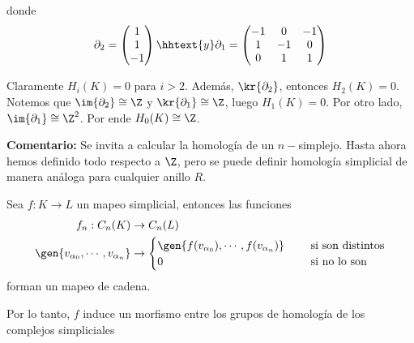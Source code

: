 \documentclass{article}
\begin{document}
\begin{enumerate}
    \vspace{2mm}
    \centerline{
    }
    \vspace{2mm}
    donde
    \begin{equation*}
        \partial_{2}=\begin{pmatrix}
            1 \\ 1 \\ -1
        \end{pmatrix}
        \hhtext{y}
        \partial_{1}=\begin{pmatrix}
            -1 & 0 & -1 \\ 1 & -1 & 0 \\ 0 & 1 & 1
        \end{pmatrix}
    \end{equation*}

    Claramente $H_{i}(K)=0$ para $i>2$. Además, $\kr{\partial_{2}}$, entonces $H_{2}(K)=0$. 
    Notemos que $\im{\partial_{2}}\cong\Z$ y $\kr{\partial_{1}}\cong\Z$, luego $H_{1}(K)=0$. Por
    otro lado, $\im{\partial_{1}}\cong\Z^{2}$. Por ende $H_{0}(K)\cong\Z$.
\end{enumerate}

\vspace{2mm}
\noindent\textbf{Comentario:} Se invita a calcular la homología de un $n-$simplejo. Hasta ahora 
hemos definido todo respecto a $\Z$, pero se puede definir homología simplicial de manera análoga 
para cualquier anillo $R$.

\vspace{2mm}
\begin{lema}
    Sea $f:K\to L$ un mapeo simplicial, entonces las funciones
    \begin{align*}
        f_{n}:C_{n}(K) &\to C_{n}(L) \\
        \gen{v_{\alpha_{0}},\cdots,v_{\alpha_{n}}} &\to \begin{cases}
            \gen{f(v_{\alpha_{0}}),\cdots,f(v_{\alpha_{n}})} &\quad\text{ si son distintos} \\
            0 &\quad\text{ si no lo son}
        \end{cases}
    \end{align*}
    forman un mapeo de cadena.
\end{lema}

\noindent Por lo tanto, $f$ induce un morfismo entre los grupos de homología de los complejos
simpliciales
\end{document}
